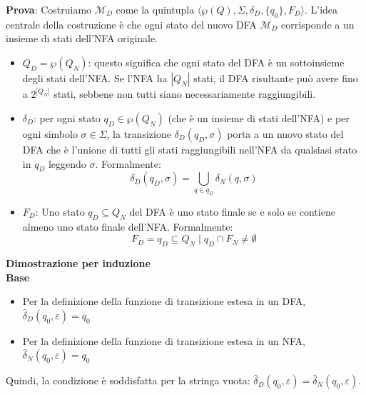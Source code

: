 \documentclass[12pt, a4paper]{report}
\begin{document}
                \begin{demonstration}
                    \textbf{Prova}: Costruiamo $\mathcal{M}_D$ come la quintupla $\langle\wp(Q),\Sigma,\delta_D,\{q_0\},F_D\rangle$. L'idea centrale della costruzione è che ogni stato del nuovo DFA $\mathcal{M}_D$ corrisponde a un insieme di stati dell'NFA originale.
                    \begin{itemize}
                        \item $Q_D=\wp(Q_N)$: questo significa che ogni stato del DFA è un sottoinsieme degli stati dell'NFA. Se l'NFA ha $|Q_N|$ stati, il DFA risultante può avere fino a $2^{|Q_N|}$ stati, sebbene non tutti siano necessariamente raggiungibili.
                        \item $\delta_D$: per ogni stato $q_D\in\wp(Q_N)$ (che è un insieme di stati dell'NFA) e per ogni simbolo $\sigma \in \Sigma$, la transizione $\delta_D(q_D, \sigma)$ porta a un nuovo stato del DFA che è l'unione di tutti gli stati raggiungibili nell'NFA da qualsiasi stato in $q_D$ leggendo $\sigma$. Formalmente: \begin{equation*}
                            \delta_D(q_D, \sigma) = \bigcup_{q \in q_D} \delta_N(q, \sigma)
                        \end{equation*}
                        \item $F_D$: Uno stato $q_D \subseteq Q_N$ del DFA è uno stato finale se e solo se contiene almeno uno stato finale dell'NFA. Formalmente: \begin{equation*}
                            F_D = {q_D \subseteq Q_N \mid q_D \cap F_N \neq \emptyset}
                        \end{equation*}
                    \end{itemize}
                    \large\textbf{Dimostrazione per induzione}\normalsize\\
                    \textbf{Base}
                    \begin{itemize}
                        \item Per la definizione della funzione di transizione estesa in un DFA, $\hat{\delta}_D({q_0}, \varepsilon) = {q_0}$
                        \item Per la definizione della funzione di transizione estesa in un NFA, $\hat{\delta}_N(q_0, \varepsilon) = {q_0}$
                    \end{itemize}
                    Quindi, la condizione è soddisfatta per la stringa vuota: $\hat{\delta}_D({q_0}, \varepsilon) = \hat{\delta}_N(q_0, \varepsilon)$.\\

\end{demonstration}
\end{document}
